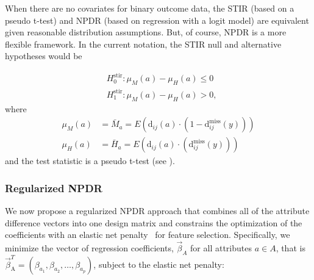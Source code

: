 \documentclass[10pt]{article}
\begin{document}
When there are no covariates for binary outcome data, the STIR (based on a pseudo t-test) and NPDR (based on regression with a logit model) are equivalent given reasonable distribution assumptions.
But, of course, NPDR is a more flexible framework. In the current notation, the STIR null and alternative hypotheses would be


\begin{equation}
\begin{aligned}
    & H^{\text{stir}}_0: \mu_M(a) - \mu_H(a) \le 0 \\
    & H^{\text{stir}}_1: \mu_M(a) - \mu_H(a) > 0,
\end{aligned}
\end{equation}  
where
\begin{equation}
\begin{aligned}
    \mu_M(a) & = \bar{M}_a = E \left( \text{d}_{ij}(a) \cdot \left( 1-\text{d}^{\text{miss}}_{ij}(y) \right) \right) \\
    \mu_H(a) & = \bar{H}_a = E \left( \text{d}_{ij}(a) \cdot \left( \text{d}^{\text{miss}}_{ij}(y) \right) \right)
\end{aligned}
\end{equation}  
and the test statistic is a pseudo t-test (see \cite{stir}).

\subsubsection{Regularized NPDR}

We now propose a regularized NPDR approach that combines all of the attribute difference vectors into one design matrix and constrains the optimization of the coefficients with an elastic net penalty~\cite{glmnet05} for feature selection.
Specifically, we minimize the vector of regression coefficients, $ \vec{\beta}_A$ for all attributes $a \in A$, that is $\vec{\beta}^{T}_{\text{A}} = (\beta_{a_1}, \beta_{a_2}, \ldots, \beta_{a_p})$, subject to the elastic net penalty: 
\end{document}
